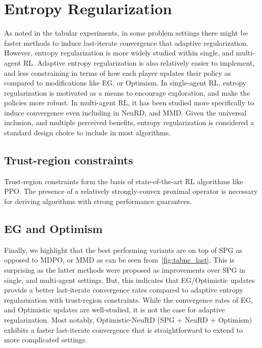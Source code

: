 \section{Entropy Regularization}
As noted in the tabular experiments, in some problem settings there might be faster methods to
induce last-iterate convergence that adaptive regularization.
However, entropy regularization is more widely studied within single, and multi-agent RL.
Adaptive entropy regularization is also relatively easier to implement, and less constraining in
terms of how each player updates their policy as compared to modifications like EG, or Optimism.
In single-agent RL, entropy regularization is motivated as a means to encourage exploration, and
make the policies more robust.
In multi-agent RL, it has been studied more specifically to induce convergence even including in
NeuRD, and MMD.
Given the universal inclusion, and multiple perceived benefits, entropy regularization is
considered a standard design choice to include in most algorithms.

\subsection{Trust-region constraints}
Trust-region constraints form the basis of state-of-the-art RL algorithms like PPO.
The presence of a relatively strongly-convex proximal operator is necessary for deriving algorithms
with strong performance guarantees.

\subsection{EG and Optimism}
Finally, we highlight that the best performing variants are on top of SPG as opposed to MDPO, or
MMD as can be seen from~\ref{fig:tabne_last}.
This is surprising as the latter methods were proposed as improvements over SPG in single, and
multi-agent settings.
But, this indicates that EG/Optimistic updates provide a better last-iterate convergence rates
compared to adaptive entropy regularization with trust-region constraints.
While the convergence rates of EG, and Optimistic updates are well-studied, it is not the case for
adaptive regularization.
Most notably, Optimistic-NeuRD (SPG + NeuRD + Optimism) exhibits a faster last-iterate convergence
that is straightforward to extend to more complicated settings.


